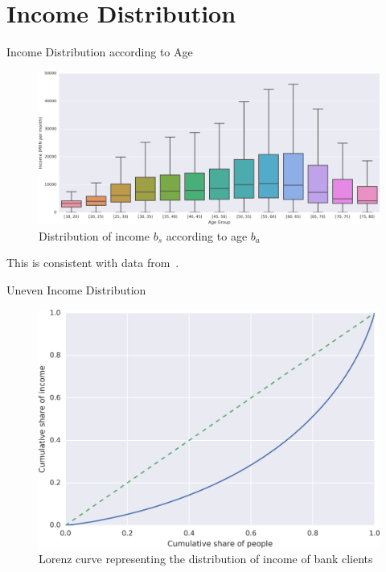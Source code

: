 \documentclass{beamer}
\begin{document}
\section{Income Distribution}

\begin{frame}{Income Distribution according to Age}

\begin{figure}
\begin{center}
\includegraphics[width=\columnwidth]{figures/income_age_boxplot4/income_age_boxplot4_wide.png}
\caption{Distribution of income $b_s$ according to age $b_a$}
\label{income_age_boxplot}
\end{center}
\end{figure}
This is consistent with data from~\cite{gallup2013}.

\end{frame}




\begin{frame}{Uneven Income Distribution}

\begin{figure}
\begin{center}
\includegraphics[width=0.8\columnwidth]{figures/cumulative_income.png}
\caption{Lorenz curve representing the distribution of income of bank clients}
\label{fig:income_distribution}
\end{center}
\end{figure}

\end{frame}
\end{document}

